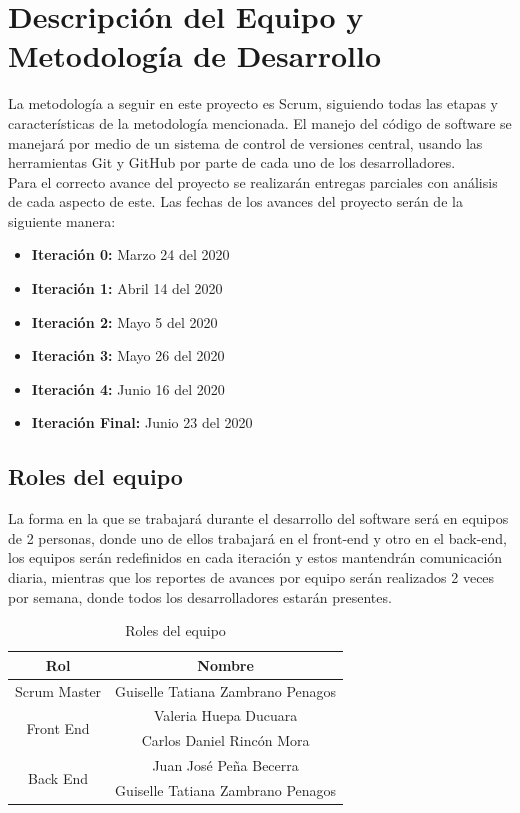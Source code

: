\documentclass[a4paper,12 pt]{article}
\begin{document}
\section{Descripción del Equipo y Metodología de Desarrollo}

La metodología a seguir en este proyecto es Scrum, siguiendo todas las etapas y
características de la metodología mencionada. El manejo del código de software
se manejará por medio de un sistema de control de versiones central, usando las
herramientas Git y GitHub por parte de cada uno de los desarrolladores. \\

Para el correcto avance del proyecto se realizarán entregas parciales con
análisis de cada aspecto de este. Las fechas de los avances del proyecto serán
de la siguiente manera:

\begin{itemize}
    \item \textbf{Iteración 0:} Marzo 24 del 2020
    \item \textbf{Iteración 1:} Abril 14 del 2020
    \item \textbf{Iteración 2:} Mayo 5 del 2020
    \item \textbf{Iteración 3:} Mayo 26 del 2020
    \item \textbf{Iteración 4:} Junio 16 del 2020
    \item \textbf{Iteración Final:} Junio 23 del 2020
\end{itemize}{}

\subsection{Roles del equipo}

La forma en la que se trabajará durante el desarrollo del software será en
equipos de 2 personas, donde uno de ellos trabajará en el front-end y otro en el
back-end, los equipos serán redefinidos en cada iteración y estos mantendrán
comunicación diaria, mientras que los reportes de avances por equipo serán
realizados 2 veces por semana, donde todos los desarrolladores estarán
presentes.

\begin{table}[H]
    \centering
    \small{
    \begin{tabular}{|c|c|}
        \hline
        \textbf{Rol}   &   \textbf{Nombre}  \\ 
        \hline
        Scrum Master   &   Guiselle Tatiana Zambrano Penagos\\
        \hline
        \multirow{2}{2cm}{Front End}    &   Valeria Huepa Ducuara\\
            &   Carlos Daniel Rincón Mora\\
        \hline
        \multirow{2}{2cm}{Back End}    &   Juan José Peña Becerra\\
            &   Guiselle Tatiana Zambrano Penagos\\
        \hline
         
    \end{tabular}
    \caption{Roles del equipo}}
    \label{T00}
\end{table}{}
\end{document}
